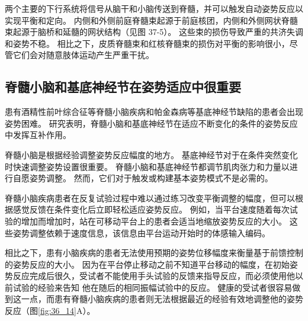 两个主要的下行系统将信号从脑干和小脑传送到脊髓，并可以触发自动姿势反应以实现平衡和定向。 内侧和外侧前庭脊髓束起源于前庭核团，内侧和外侧网状脊髓束起源于脑桥和延髓的网状结构（见图 37-5）。 这些束的损伤导致严重的共济失调和姿势不稳。 相比之下，皮质脊髓束和红核脊髓束的损伤对平衡的影响很小，尽管它们会对随意肢体运动产生严重干扰。

\subsection{脊髓小脑和基底神经节在姿势适应中很重要}
患有酒精性前叶综合征等脊髓小脑疾病和帕金森病等基底神经节缺陷的患者会出现姿势困难。 研究表明，脊髓小脑和基底神经节在适应不断变化的条件的姿势反应中发挥互补作用。

脊髓小脑是根据经验调整姿势反应幅度的地方。 基底神经节对于在条件突然变化时快速调整姿势设置很重要。 脊髓小脑和基底神经节都调节肌肉张力和力量以进行自愿姿势调整。 然而，它们对于触发或构建基本姿势模式不是必需的。

脊髓小脑疾病患者在反复试验过程中难以通过练习改变平衡调整的幅度，但可以根据感觉反馈在条件变化后立即轻松适应姿势反应。 例如，当平台速度随着每次试验的增加而增加时，站在可移动平台上的患者会适当地缩放姿势反应的大小。 这些姿势调整依赖于速度信息，该信息由平台运动开始时的体感输入编码。

相比之下，患有小脑疾病的患者无法使用预期的姿势位移幅度来衡量基于前馈控制的姿势反应的大小。 因为在平台停止移动之前不知道平台移动的幅度，在初始姿势反应完成后很久，受试者不能使用手头试验的反馈来指导反应，而必须使用他以前试验的经验来告知 他在随后的相同振幅试验中的反应。 
健康的受试者很容易做到这一点，而患有脊髓小脑疾病的患者则无法根据最近的经验有效地调整他的姿势反应（图\ref{fig:36_14}A）。

